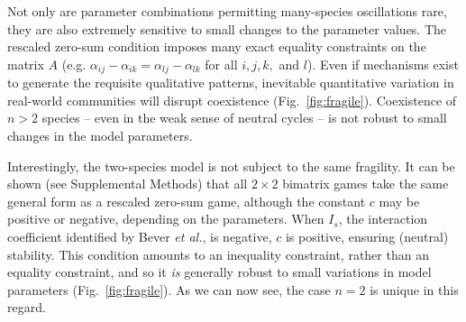 \documentclass[11pt]{article}
\begin{document}
Not only are parameter combinations permitting many-species oscillations rare, they are also extremely sensitive to small changes to the parameter values. The rescaled zero-sum condition imposes many exact equality constraints on the matrix $A$ (e.g. $\alpha_{ij} - \alpha_{ik} = \alpha_{lj} - \alpha_{lk}$ for all $i, j, k,$ and $l$). Even if mechanisms exist to generate the requisite qualitative patterns, inevitable quantitative variation in real-world communities will disrupt coexistence (Fig.~\ref{fig:fragile}). Coexistence of $n > 2$ species -- even in the weak sense of neutral cycles -- is not robust to small changes in the model parameters.

Interestingly, the two-species model is not subject to the same fragility. It can be shown (see Supplemental Methods) that all $2 \times 2$ bimatrix games take the same general form as a rescaled zero-sum game, although the constant $c$ may be positive or negative, depending on the parameters. When $I_s$, the interaction coefficient identified by Bever \textit{et al.}, is negative, $c$ is positive, ensuring (neutral) stability. This condition amounts to an inequality constraint, rather than an equality constraint, and so it \emph{is} generally robust to small variations in model parameters (Fig.~\ref{fig:fragile}). As we can now see, the case $n = 2$ is unique in this regard. 
\end{document}
